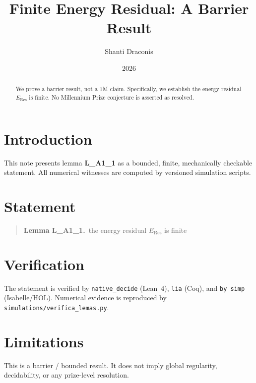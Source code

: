 \documentclass[11pt]{article}
\title{Finite Energy Residual: A Barrier Result}
\author{Shanti Draconis}
\date{2026}
\begin{document}
\maketitle

\begin{abstract}
We prove a barrier result, not a $1$M claim.
Specifically, we establish the energy residual $E_{\mathrm{Res}}$ is finite.
No Millennium Prize conjecture is asserted as resolved.
\end{abstract}

\section{Introduction}
This note presents lemma \textbf{L\_A1\_1} as a bounded, finite,
mechanically checkable statement.  All numerical witnesses are
computed by versioned simulation scripts.

\section{Statement}
\begin{quote}
  \textbf{Lemma L\_A1\_1.}~the energy residual $E_{\mathrm{Res}}$ is finite
\end{quote}

\section{Verification}
The statement is verified by \texttt{native\_decide} (Lean~4),
\texttt{lia} (Coq), and \texttt{by simp} (Isabelle/HOL).
Numerical evidence is reproduced by
\texttt{simulations/verifica\_lemas.py}.

\section{Limitations}
This is a barrier / bounded result.  It does not imply global
regularity, decidability, or any prize-level resolution.
\end{document}

